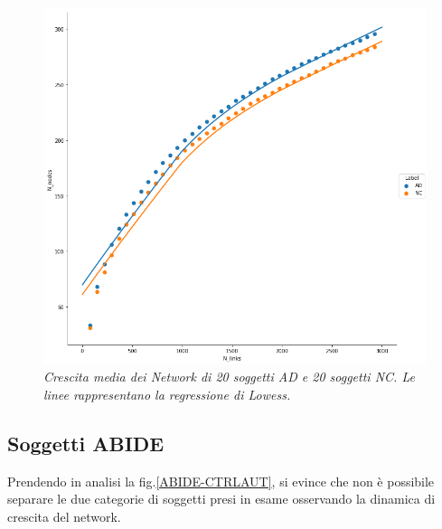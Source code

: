 \documentclass[12pt,openright,a4paper]{article}
\begin{document}
\begin{figure}[!h]
\centering
\includegraphics[scale=0.4]{Average-Lowess20}
\caption{\textit{Crescita media dei Network di 20 soggetti AD e 20 soggetti NC. Le linee rappresentano la regressione di Lowess. }}
\label{ADNI-Average}
\end{figure}

\clearpage

\subsection{Soggetti ABIDE}

Prendendo in analisi la fig.\ref{ABIDE-CTRLAUT}, si evince che non è possibile separare le due categorie di soggetti presi in esame osservando la dinamica di crescita del network.
\end{document}
